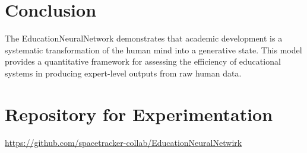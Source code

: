 \documentclass[12pt]{article}
\begin{document}
\section{Conclusion}
The EducationNeuralNetwork demonstrates that academic development is a systematic transformation of the human mind into a generative state. This model provides a quantitative framework for assessing the efficiency of educational systems in producing expert-level outputs from raw human data.

\section{Repository for Experimentation}
\noindent
\url{https://github.com/spacetracker-collab/EducationNeuralNetwirk}
\end{document}
